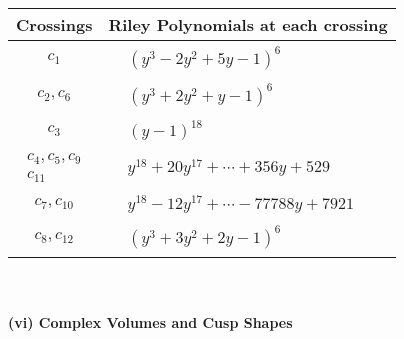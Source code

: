 \documentclass[1p]{elsarticle_modified}
\theoremstyle{definition}
\begin{document}
\begin{tabular}{m{50pt}|m{274pt}}
Crossings & \hspace{64pt}Riley Polynomials at each crossing \\
\hline $$\begin{aligned}c_{1}\end{aligned}$$&$\begin{aligned}
&(y^3-2 y^2+5 y-1)^6
\end{aligned}$\\
\hline $$\begin{aligned}c_{2},c_{6}\end{aligned}$$&$\begin{aligned}
&(y^3+2 y^2+y-1)^6
\end{aligned}$\\
\hline $$\begin{aligned}c_{3}\end{aligned}$$&$\begin{aligned}
&(y-1)^{18}
\end{aligned}$\\
\hline $$\begin{aligned}c_{4},c_{5},c_{9}\\c_{11}\end{aligned}$$&$\begin{aligned}
&y^{18}+20 y^{17}+\cdots+356 y+529
\end{aligned}$\\
\hline $$\begin{aligned}c_{7},c_{10}\end{aligned}$$&$\begin{aligned}
&y^{18}-12 y^{17}+\cdots-77788 y+7921
\end{aligned}$\\
\hline $$\begin{aligned}c_{8},c_{12}\end{aligned}$$&$\begin{aligned}
&(y^3+3 y^2+2 y-1)^6
\end{aligned}$\\
\hline
\end{tabular}\\~\\
\newpage\flushleft \textbf{(vi) Complex Volumes and Cusp Shapes}
\end{document}
